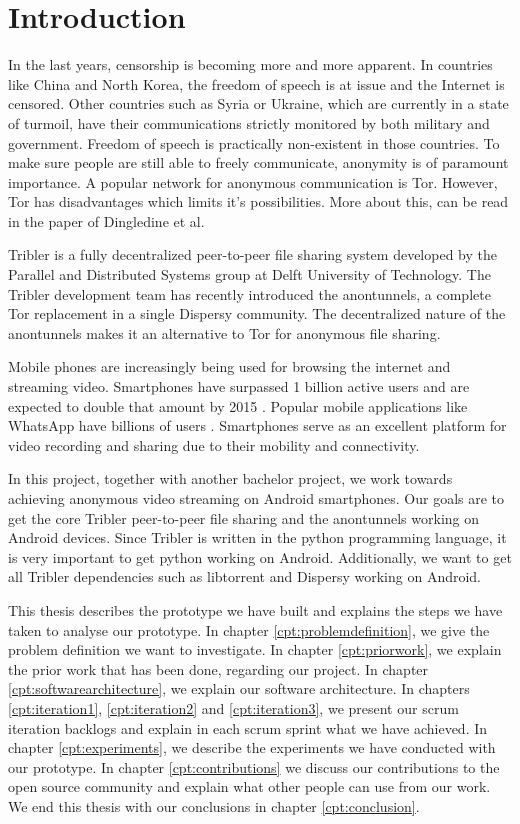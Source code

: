 \chapter{Introduction}
In the last years, censorship is becoming more and more apparent. In countries like China and North Korea, the freedom of speech is at issue and the Internet is censored. Other countries such as Syria or Ukraine, which are currently in a state of turmoil, have their communications strictly monitored by both military and government. Freedom of speech is practically non-existent in those countries. To make sure people are still able to freely communicate, anonymity is of paramount importance. A popular network for anonymous communication is Tor. However, Tor has disadvantages which limits it's possibilities. More about this, can be read in the paper of Dingledine et al. \cite{dingledine2009performance}

Tribler is a fully decentralized peer-to-peer file sharing system developed by the Parallel and Distributed Systems group at Delft University of Technology. The Tribler development team has recently introduced the anontunnels, a complete Tor replacement in a single Dispersy community. The decentralized nature of the anontunnels makes it an alternative to Tor for anonymous file sharing.

Mobile phones are increasingly being used for browsing the internet and streaming video. Smartphones have surpassed 1 billion active users and are expected to double that amount by 2015 \cite{yang2015smartphones}. Popular mobile applications like WhatsApp have billions of users \cite{googleplayinstagram, googleplaywhatsapp}. Smartphones serve as an excellent platform for video recording and sharing due to their mobility and connectivity.

In this project, together with another bachelor project, we work towards achieving anonymous video streaming on Android smartphones. Our goals are to get the core Tribler peer-to-peer file sharing and the anontunnels working on Android devices. Since Tribler is written in the python programming language, it is very important to get python working on Android. Additionally, we want to get all Tribler dependencies such as libtorrent and Dispersy working on Android.

This thesis describes the prototype we have built and explains the steps we have taken to analyse our prototype. In chapter \ref{cpt:problemdefinition}, we give the problem definition we want to investigate. In chapter \ref{cpt:priorwork}, we explain the prior work that has been done, regarding our project. In chapter \ref{cpt:softwarearchitecture}, we explain our software architecture. In chapters \ref{cpt:iteration1}, \ref{cpt:iteration2} and \ref{cpt:iteration3}, we present our scrum iteration backlogs and explain in each scrum sprint what we have achieved. In chapter \ref{cpt:experiments}, we describe the experiments we have conducted with our prototype. In chapter \ref{cpt:contributions} we discuss our contributions to the open source community and explain what other people can use from our work. We end this thesis with our conclusions in chapter \ref{cpt:conclusion}.